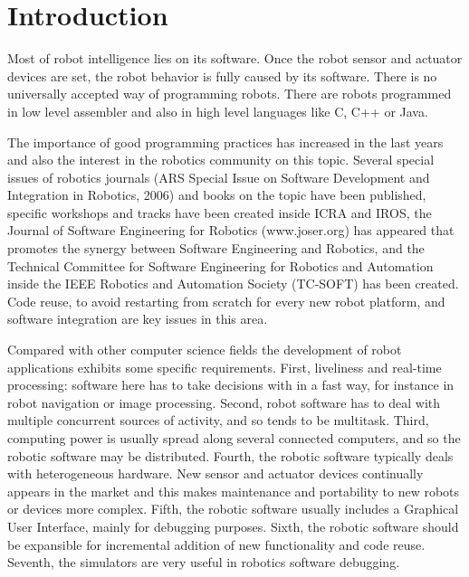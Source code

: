 \documentclass[twocolumn]{svjour3}          %
\begin{document}
\section{Introduction}
\label{intro}

Most of robot intelligence lies on its software. Once the robot sensor and actuator devices are set, the robot behavior is fully caused by its software. There is no universally accepted way of programming robots. There are robots programmed in low level assembler and also in high level languages like C, C++ or Java. 

The importance of good programming practices has increased in the last years and also the interest in the robotics community on this topic. Several special issues of robotics journals (ARS Special Issue on Software Development and Integration in Robotics, 2006) and books on the topic \cite{brugali2007} have been published, specific workshops and tracks have been created inside ICRA and IROS, the Journal of Software Engineering for Robotics (www.joser.org) has appeared that promotes the synergy between Software Engineering and Robotics, and the Technical Committee for Software Engineering for Robotics and Automation inside the IEEE Robotics and Automation Society (TC-SOFT) has been created. Code reuse, to avoid restarting from scratch for every new robot platform, and software integration are key issues in this area. 


Compared with other computer science fields the development of robot applications exhibits some specific requirements. First, liveliness and real-time processing: software here has to take decisions with in a fast way, for instance in robot navigation or image processing. Second, robot software has to deal with multiple concurrent sources of activity, and so tends to be multitask. Third, computing power is usually spread along several connected computers, and so the robotic software may be distributed. Fourth, the robotic software typically deals with heterogeneous hardware. New sensor and actuator devices continually appears in the market and this makes maintenance and portability to new robots or devices more complex. Fifth, the robotic software usually includes a Graphical User Interface, mainly for debugging purposes. Sixth, the robotic software should be expansible for incremental addition of new functionality and code reuse. Seventh, the simulators are very useful in robotics software debugging.
\end{document}
